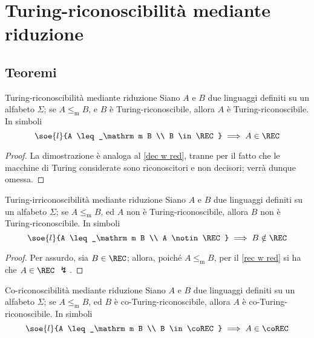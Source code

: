 \documentclass[a4paper, 12pt]{report}
\begin{document}
    \section{Turing-riconoscibilità mediante riduzione}

    \subsection{Teoremi}

    \begin{framedthm}[label={rec w red}]{Turing-riconoscibilità mediante riduzione}
        Siano $A$ e $B$ due linguaggi definiti su un alfabeto $\Sigma$; se $A \leq_\mathrm m B$, e $B$ è Turing-riconoscibile, allora $A$ è Turing-riconoscibile. In simboli $$\soe{l}{A \leq_\mathrm m B \\ B \in \REC} \implies A \in \REC$$
    \end{framedthm}

    \begin{proof}
        La dimostrazione è analoga al \cref{dec w red}, tranne per il fatto che le macchine di Turing considerate sono riconoscitori e non decisori; verrà dunque omessa.
    \end{proof}

    \begin{framedcor}[label={rec w red cor}]{Turing-irriconoscibilità mediante riduzione}
        Siano $A$ e $B$ due linguaggi definiti su un alfabeto $\Sigma$; se $A \leq_\mathrm m B$, ed $A$ non è Turing-riconoscibile, allora $B$ non è Turing-riconoscibile. In simboli $$\soe{l}{A \leq_\mathrm m B \\ A \notin \REC} \implies B \notin \REC$$
    \end{framedcor}

    \begin{proof}
        Per assurdo, sia $B \in \REC$; allora, poiché $A \leq_\mathrm m B$, per il \cref{rec w red} si ha che $A \in \REC$ $\lightning$.
    \end{proof}

    \begin{framedcor}[label={corec w red}]{Co-riconoscibilità mediante riduzione}
        Siano $A$ e $B$ due linguaggi definiti su un alfabeto $\Sigma$; se $A \leq_\mathrm m B$, ed $B$ è co-Turing-riconoscibile, allora $A$ è co-Turing-riconoscibile. In simboli $$\soe{l}{A \leq_\mathrm m B \\ B \in \coREC} \implies A \in \coREC$$
    \end{framedcor}
\end{document}
